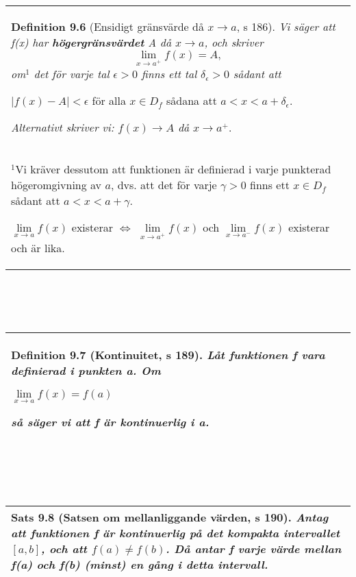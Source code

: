 \documentclass[a4paper]{article}
\begin{document}
\\\\\\
\begin{tabular}{|L{11.5cm}|} \hline
\textbf{Definition 9.6} (Ensidigt gränsvärde då $x\rightarrow a$, s 186).
\textit{Vi säger att f(x) har \textbf{högergränsvärdet} A då $x \rightarrow a$, och skriver}
\begin{displaymath}
\lim_{x\rightarrow a^+}f(x)=A,
\end{displaymath}
\textit{om$^1$ det för varje tal $\epsilon > 0$ finns ett tal $\delta_\epsilon>0$ sådant att}
\begin{center}
$|f(x)-A| < \epsilon$ \hspace{0.5cm} för alla $x\in D_f$ sådana att $a<x<a+\delta_\epsilon$.
\end{center}
\textit{Alternativt skriver vi: $f(x) \rightarrow A$ då $x\rightarrow a^+$}.\\
\scriptsize$^1$Vi kräver dessutom att funktionen är definierad i varje punkterad högeromgivning av $a$, dvs. att det för varje $\gamma>0$ finns ett $x\in D_f$ sådant att $a<x<a+\gamma$.
\begin{center}
\normalsize$\lim\limits_{x\rightarrow a} f(x)$ existerar \hspace{0.3cm} $\Leftrightarrow$ \hspace{0.3cm} $\lim\limits_{x\rightarrow a^+}f(x)$ och $\lim\limits_{x\rightarrow a^-} f(x)$ existerar och är lika.
\end{center}
\\\hline
\end{tabular}
\\\\\\
\begin{tabular}{|L{11.5cm}|} \hline
\textbf{Definition 9.7} (Kontinuitet, s 189). 
\textit{Låt funktionen f vara definierad i punkten a. Om}
\begin{center}
$\lim\limits_{x\rightarrow a} f(x) = f(a)$
\end{center}
\textit{så säger vi att f är \textbf{kontinuerlig} i a.}
\\\hline
\end{tabular}
\\\\\\
\begin{tabular}{|L{11.5cm}|} \hline
\textbf{Sats 9.8} (Satsen om mellanliggande värden, s 190). 
\textit{Antag att funktionen f är kontinuerlig på det kompakta intervallet $[a,b]$, och att $f(a)\neq f(b)$. Då antar f varje värde mellan f(a) och f(b) (minst) en gång i detta intervall.}
\\\hline
\end{tabular}
\end{document}
